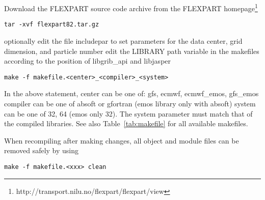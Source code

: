 \documentclass{egu}            %
\begin{document}
Download the FLEXPART source code archive from the FLEXPART
homepage\footnote{http://transport.nilu.no/flexpart/flexpart/view}

\begin{small}
\begin{verbatim}
tar -xvf flexpart82.tar.gz
\end{verbatim}
\end{small}
optionally edit the file includepar to set parameters for the data center, grid
dimension, and particle number edit the LIBRARY path variable in the makefiles
according to the position of libgrib\_api and libjasper
\begin{small}
\begin{verbatim}
make -f makefile.<center>_<compiler>_<system>
\end{verbatim}
\end{small}
In the above statement, center can be one of: gfs, ecmwf, ecmwf\_emos,
gfs\_emos compiler can be one of absoft or gfortran (emos library only with
absoft) system can be one of 32, 64 (emos only 32).  The system parameter must
match that of the compiled libraries. See also Table~\ref{tab:makefile} for all 
available makefiles.

When recompiling after making changes, all object and module files can be
removed safely by using
\begin{small}
\begin{verbatim}
make -f makefile.<xxx> clean
\end{verbatim}
\end{small}

\end{document}
